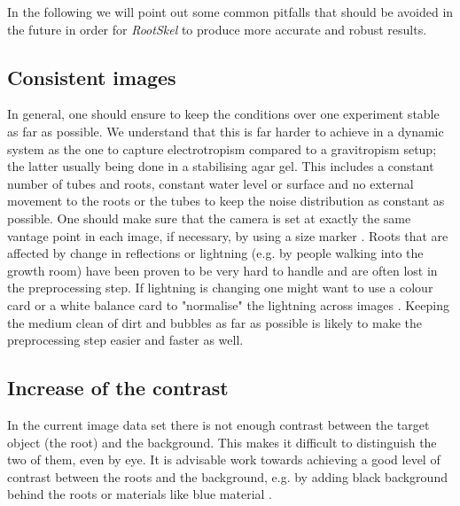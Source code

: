 In the following we will point out some common pitfalls that should be avoided in the future in order for \textit{RootSkel} to produce more accurate and robust results.


\subsection{Consistent images}

In general, one should ensure to keep the conditions over one experiment stable as far as possible. We understand that this is far harder to achieve in a dynamic system as the one to capture electrotropism compared to a gravitropism setup; the latter usually being done in a stabilising agar gel. 
This includes a constant number of tubes and roots, constant water level or surface and no external movement to the roots or the tubes to keep the noise distribution as constant as possible. One should make sure that the camera is set at exactly the same vantage point in each image, if necessary, by using a size marker \cite{plantCV}. 
Roots that are affected by change in reflections or lightning (e.g. by people walking into the growth room) have been proven to be very hard to handle and are often lost in the preprocessing step. If lightning is changing one might want to use a colour card or a white balance card to "normalise" the lightning across images \cite{plantCV}. 
Keeping the medium clean of dirt and bubbles as far as possible is likely to make the preprocessing step easier and faster as well.


\subsection{Increase of the contrast}

In the current image data set there is not enough contrast between the target object (the root) and the background. This makes it difficult to distinguish the two of them, even by eye. It is advisable work towards achieving a good level of contrast between the roots and the background, e.g. by adding black background behind the roots or materials like blue material \cite{plantCV}. 


